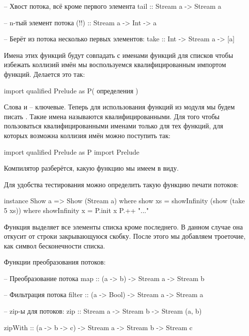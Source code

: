 \begin{itemize}
\begin{code}
-- Хвост потока, всё кроме первого элемента
tail :: Stream a -> Stream a

-- n-тый элемент потока
(!!) :: Stream a -> Int -> a

-- Берёт из потока несколько первых элементов:
take :: Int -> Stream a -> [a]
\end{code}

Имена этих функций будут совпадать с именами функций
для списков чтобы избежать коллизий имён мы воспользуемся
квалифицированным импортом функций. Делается это так:

\begin{code}
import qualified Prelude as P( определения )
\end{code}

Слова   и  -- ключевые. Теперь для
использования функций из модуля  мы будем 
писать . Такие имена называются 
квалифицированными. Для того чтобы пользоваться 
квалифицированными именами только для тех функций, для
которых возможна коллизия имён можно поступить так:

\begin{code}
import qualified Prelude as P
import Prelude
\end{code}

Компилятор разберётся, какую функцию мы имеем в виду. 

Для удобства тестирования можно определить такую функцию 
печати потоков:

\begin{code}
instance Show a => Show (Stream a) where
    show xs =  showInfinity (show (take 5 xs))
        where showInfinity x = P.init x  P.++ "..."
\end{code}

Функция  выделяет все элементы списка кроме
последнего. В данном случае она откусит от строки закрывающуюся
скобку. После этого мы добавляем троеточие, как символ бесконечности списка.

Функции преобразования потоков:

\begin{code}
-- Преобразование потока
map :: (a -> b) -> Stream a -> Stream b

-- Фильтрация потока
filter :: (a -> Bool) -> Stream a -> Stream a

-- zip-ы для потоков:
zip :: Stream a -> Stream b -> Stream (a, b)

zipWith :: (a -> b -> c) -> Stream a -> Stream b -> Stream c 
\end{code}


\end{itemize}
